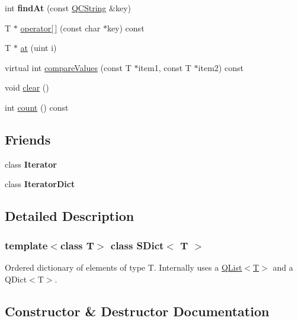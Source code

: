 \begin{DoxyCompactItemize}
\mbox{\label{class_s_dict_a6a05b33d4c87325d4f2826921910c89d}} 
int {\bfseries find\+At} (const \mbox{\hyperlink{class_q_c_string}{Q\+C\+String}} \&key)
\item 
T $\ast$ \mbox{\hyperlink{class_s_dict_a84c35184adf3011e621afcaff550ba86}{operator\mbox{[}$\,$\mbox{]}}} (const char $\ast$key) const
\item 
T $\ast$ \mbox{\hyperlink{class_s_dict_ab993899004fc3cfc8f00f131e0b6a29d}{at}} (uint i)
\item 
virtual int \mbox{\hyperlink{class_s_dict_a10086963aca06a9af9e0e6d75bf49763}{compare\+Values}} (const T $\ast$item1, const T $\ast$item2) const
\item 
void \mbox{\hyperlink{class_s_dict_afd6bec6aaf77e2943f42cec1208bc46d}{clear}} ()
\item 
int \mbox{\hyperlink{class_s_dict_a5149795edc957f3bc5af4b536af6d743}{count}} () const
\end{DoxyCompactItemize}
\subsection*{Friends}
\begin{DoxyCompactItemize}
\item 
\mbox{\label{class_s_dict_a9830fc407400559db7e7783cc10a9394}} 
class {\bfseries Iterator}
\item 
\mbox{\label{class_s_dict_ab362b5ead75b40c212098db068d50ac7}} 
class {\bfseries Iterator\+Dict}
\end{DoxyCompactItemize}


\subsection{Detailed Description}
\subsubsection*{template$<$class T$>$\newline
class S\+Dict$<$ T $>$}

Ordered dictionary of elements of type T. Internally uses a \mbox{\hyperlink{class_q_list}{Q\+List$<$\+T$>$}} and a Q\+Dict$<$\+T$>$. 

\subsection{Constructor \& Destructor Documentation}
\mbox{\label{class_s_dict_a302a5a7c25fce8e9e93f7dede81ad503}} 
